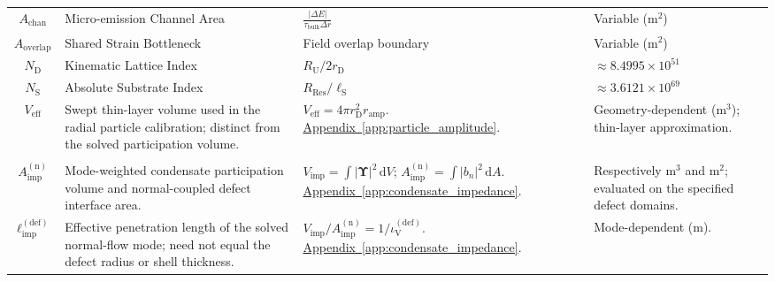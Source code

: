 \begin{longtable}{@{} c p{5.5cm} p{4cm} p{3.5cm} @{}}
$A_{\mathrm{chan}}$ & Micro-emission Channel Area & $\frac{|\Delta E|}{\tau_{\mathrm{bulk}} \Delta r}$ & Variable ($\text{m}^2$) \\

$A_{\mathrm{overlap}}$ & Shared Strain Bottleneck & Field overlap boundary & Variable ($\text{m}^2$) \\

$N_{\mathrm{D}}$ & Kinematic Lattice Index & $R_{\mathrm{U}} / 2r_{\mathrm{D}}$ & $\approx 8.4995 \times 10^{51}$ \\

$N_{\mathrm{S}}$ & Absolute Substrate Index & $R_{\mathrm{Res}} / \ell_{\mathrm{S}}$ & $\approx 3.6121 \times 10^{69}$ \\

$V_{\mathrm{eff}}$ & {\raggedright Swept thin-layer volume used in the radial particle calibration; distinct from the solved participation volume.\par} & {\raggedright $V_{\mathrm{eff}}=4\pi r_{\mathrm D}^{2}r_{\mathrm{amp}}$. \newline \hyperref[app:particle_amplitude]{Appendix~\ref*{app:particle_amplitude}}.\par} & {\raggedright Geometry-dependent ($\mathrm{m^3}$); thin-layer approximation.\par} \\

\begin{tabular}[c]{@{}c@{}}$V_{\mathrm{imp}}$ \\ $A_{\mathrm{imp}}^{(\mathrm n)}$\end{tabular} & {\raggedright Mode-weighted condensate participation volume and normal-coupled defect interface area.\par} & {\raggedright $V_{\mathrm{imp}}=\int|\boldsymbol\Upsilon|^2\,\mathrm dV$; $A_{\mathrm{imp}}^{(\mathrm n)}=\int|b_n|^2\,\mathrm dA$. \newline \hyperref[app:condensate_impedance]{Appendix~\ref*{app:condensate_impedance}}.\par} & {\raggedright Respectively $\mathrm{m^3}$ and $\mathrm{m^2}$; evaluated on the specified defect domains.\par} \\

$\ell_{\mathrm{imp}}^{(\mathrm{def})}$ & {\raggedright Effective penetration length of the solved normal-flow mode; need not equal the defect radius or shell thickness.\par} & {\raggedright $V_{\mathrm{imp}}/A_{\mathrm{imp}}^{(\mathrm n)}=1/\iota_{\mathrm V}^{(\mathrm{def})}$. \newline \hyperref[app:condensate_impedance]{Appendix~\ref*{app:condensate_impedance}}.\par} & {\raggedright Mode-dependent ($\mathrm m$).\par} \\



\end{longtable}
